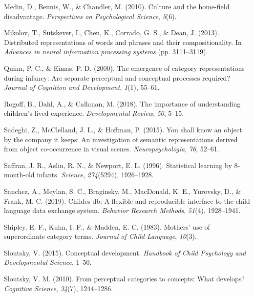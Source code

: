 \documentclass[english,,man,floatsintext]{apa6}
\begin{document}
\leavevmode\hypertarget{ref-medin2010}{}%
Medin, D., Bennis, W., \& Chandler, M. (2010). Culture and the home-field disadvantage. \emph{Perspectives on Psychological Science}, \emph{5}(6).

\leavevmode\hypertarget{ref-mikolov2013}{}%
Mikolov, T., Sutskever, I., Chen, K., Corrado, G. S., \& Dean, J. (2013). Distributed representations of words and phrases and their compositionality. In \emph{Advances in neural information processing systems} (pp. 3111--3119).

\leavevmode\hypertarget{ref-quinn2000}{}%
Quinn, P. C., \& Eimas, P. D. (2000). The emergence of category representations during infancy: Are separate perceptual and conceptual processes required? \emph{Journal of Cognition and Development}, \emph{1}(1), 55--61.

\leavevmode\hypertarget{ref-rogoff2018}{}%
Rogoff, B., Dahl, A., \& Callanan, M. (2018). The importance of understanding children's lived experience. \emph{Developmental Review}, \emph{50}, 5--15.

\leavevmode\hypertarget{ref-sadeghi2015}{}%
Sadeghi, Z., McClelland, J. L., \& Hoffman, P. (2015). You shall know an object by the company it keeps: An investigation of semantic representations derived from object co-occurrence in visual scenes. \emph{Neuropsychologia}, \emph{76}, 52--61.

\leavevmode\hypertarget{ref-saffran1996}{}%
Saffran, J. R., Aslin, R. N., \& Newport, E. L. (1996). Statistical learning by 8-month-old infants. \emph{Science}, \emph{274}(5294), 1926--1928.

\leavevmode\hypertarget{ref-sanchez2019}{}%
Sanchez, A., Meylan, S. C., Braginsky, M., MacDonald, K. E., Yurovsky, D., \& Frank, M. C. (2019). Childes-db: A flexible and reproducible interface to the child language data exchange system. \emph{Behavior Research Methods}, \emph{51}(4), 1928--1941.

\leavevmode\hypertarget{ref-shipley1983}{}%
Shipley, E. F., Kuhn, I. F., \& Madden, E. C. (1983). Mothers' use of superordinate category terms. \emph{Journal of Child Language}, \emph{10}(3).

\leavevmode\hypertarget{ref-sloutsky2015}{}%
Sloutsky, V. (2015). Conceptual development. \emph{Handbook of Child Psychology and Developmental Science}, 1--50.

\leavevmode\hypertarget{ref-sloutsky2010}{}%
Sloutsky, V. M. (2010). From perceptual categories to concepts: What develops? \emph{Cognitive Science}, \emph{34}(7), 1244--1286.
\end{document}
